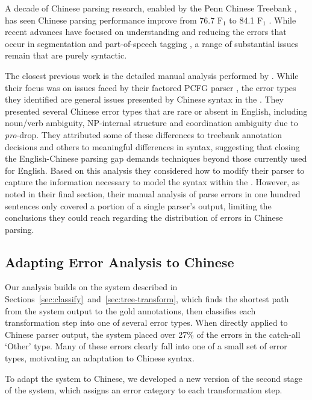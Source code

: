 A decade of Chinese parsing research, enabled by the Penn Chinese Treebank \parencite[\pctb;][]{Xue:2005:NLE}, has seen Chinese parsing performance improve from 76.7 F$_1$ \parencite{Bikel-Chiang:2000:CLP} to 84.1 F$_1$ \parencite{Qian-Liu:2012:EMNLP}.
While recent advances have focused on understanding and reducing the errors that occur in segmentation and part-of-speech tagging \parencite{Qian-Liu:2012:EMNLP,Jiang-etal:2009:ACL,Forst-Fang:2009:EACL}, a range of substantial issues remain that are purely syntactic.

The closest previous work is the detailed manual analysis performed by \textcite{Levy-Manning:2003:ACL}.
While their focus was on issues faced by their factored PCFG parser \parencite{Klein-Manning:2003:NIPS}, the error types they identified are general issues presented by Chinese syntax in the \pctb.
They presented several Chinese error types that are rare or absent in English, including noun/verb ambiguity, NP-internal structure and coordination ambiguity due to \emph{pro}-drop.
They attributed some of these differences to treebank annotation decisions and others to meaningful differences in syntax, suggesting that closing the English-Chinese parsing gap demands techniques beyond those currently used for English.
Based on this analysis they considered how to modify their parser to capture the information necessary to model the syntax within the \pctb.
However, as noted in their final section, their manual analysis of parse errors in one hundred sentences only covered a portion of a single parser's output, limiting the conclusions they could reach regarding the distribution of errors in Chinese parsing.

\subsection{Adapting Error Analysis to Chinese} \label{sec:adapting_automatic_error_analysis_to_chinese}

Our analysis builds on the system described in Sections~\ref{sec:classify}~and~\ref{sec:tree-transform}, which finds the shortest path from the system output to the gold annotations, then classifies each transformation step into one of several error types.
When directly applied to Chinese parser output, the system placed over 27\% of the errors in the catch-all `Other' type.
Many of these errors clearly fall into one of a small set of error types, motivating an adaptation to Chinese syntax.

To adapt the system to Chinese, we developed a new version of the second stage of the system, which assigns an error category to each transformation step.

